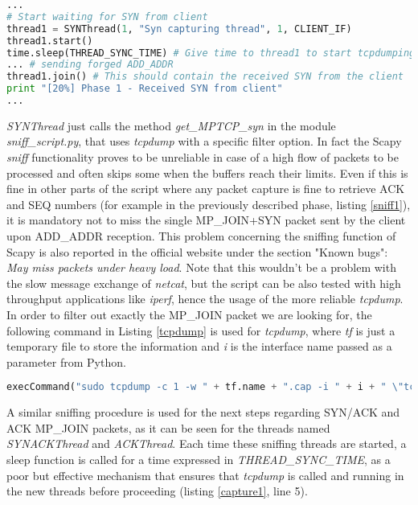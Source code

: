 \begin{lstlisting}[language=python, caption=\textit{Multiple threads are used to capture the answer from the UMLs}, label=capture1]
...
# Start waiting for SYN from client
thread1 = SYNThread(1, "Syn capturing thread", 1, CLIENT_IF)
thread1.start()
time.sleep(THREAD_SYNC_TIME) # Give time to thread1 to start tcpdumping
... # sending forged ADD_ADDR
thread1.join() # This should contain the received SYN from the client
print "[20%] Phase 1 - Received SYN from client"
...
\end{lstlisting}

\textit{SYNThread} just calls the method \textit{get\_MPTCP\_syn} in the module \textit{sniff\_script.py}, that uses \textit{tcpdump} with a specific filter option. In fact the Scapy \textit{sniff} functionality proves to be unreliable in case of a high flow of packets to be processed and often skips some when the buffers reach their limits. Even if this is fine in other parts of the script where any packet capture is fine to retrieve ACK and SEQ numbers (for example in the previously described phase, listing \ref{sniff1}), it is mandatory not to miss the single MP\_JOIN+SYN packet sent by the client upon ADD\_ADDR reception. This problem concerning the sniffing function of Scapy is also reported in the official website under the section "Known bugs": \textit{May miss packets under heavy load}.
Note that this wouldn't be a problem with the slow message exchange of \textit{netcat}, but the script can be also tested with high throughput applications like \textit{iperf}, hence the usage of the more reliable \textit{tcpdump}.
In order to filter out exactly the MP\_JOIN packet we are looking for, the following command in Listing \ref{tcpdump} is used for \textit{tcpdump}, where \textit{tf} is just a temporary file to store the information and \textit{i} is the interface name passed as a parameter from Python.

\begin{lstlisting}[language=python, caption=\textit{tcpdump for MP\_JOIN}, label=tcpdump]
execCommand("sudo tcpdump -c 1 -w " + tf.name + ".cap -i " + i + " \"tcp[tcpflags] & tcp-syn != 0\" 2>/dev/null", shell = True)
\end{lstlisting}

A similar sniffing procedure is used for the next steps regarding SYN/ACK and ACK MP\_JOIN packets, as it can be seen for the threads named \textit{SYNACKThread} and \textit{ACKThread}. Each time these sniffing threads are started, a sleep function is called for a time expressed in \textit{THREAD\_SYNC\_TIME}, as a poor but effective mechanism that ensures that \textit{tcpdump} is called and running in the new threads before proceeding (listing \ref{capture1}, line 5).

